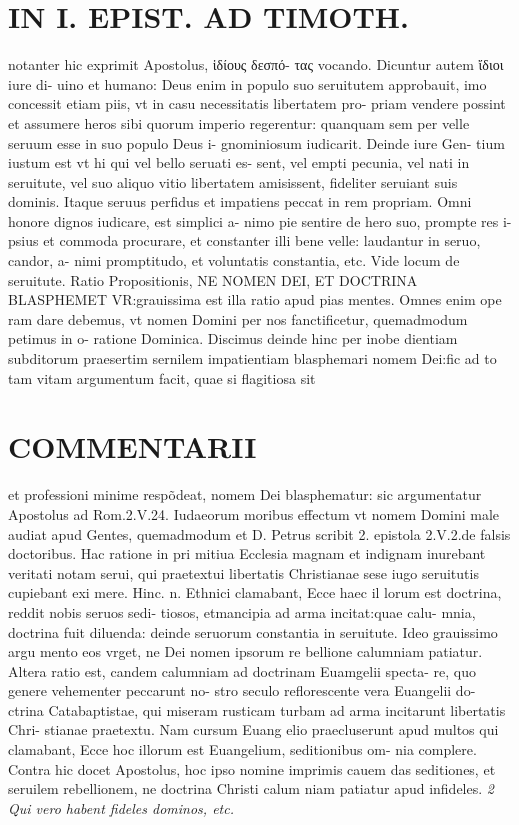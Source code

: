 \documentclass{article}
\begin{document}
\begin{pages}
\section*{IN I. EPIST. AD TIMOTH. }
\marginpar{[ p.145 ]}\pstart notanter hic exprimit Apostolus, ἱδίους δεσπό- τας vocando. Dicuntur autem ἴδιοι iure di- uino et humano: Deus enim in populo suo seruitutem approbauit, imo concessit etiam piis, vt in casu necessitatis libertatem pro- priam vendere possint et assumere heros sibi quorum imperio regerentur: quanquam sem per velle seruum esse in suo populo Deus i- gnominiosum iudicarit. Deinde iure Gen- tium iustum est vt hi qui vel bello seruati es- sent, vel empti pecunia, vel nati in seruitute, vel suo aliquo vitio libertatem amisissent, fideliter seruiant suis dominis. Itaque seruus perfidus et impatiens peccat in rem propriam. Omni honore dignos iudicare, est simplici a- nimo pie sentire de hero suo, prompte res i- psius et commoda procurare, et constanter illi bene velle: laudantur in seruo, candor, a- nimi promptitudo, et voluntatis constantia, etc. Vide locum de seruitute.  \pend\pstart Ratio Propositionis, NE NOMEN DEI, ET DOCTRINA BLASPHEMET VR:grauissima est illa ratio apud pias mentes. Omnes enim ope ram dare debemus, vt nomen Domini per nos fanctificetur, quemadmodum petimus in o- ratione Dominica. Discimus deinde hinc per inobe dientiam subditorum praesertim sernilem impatientiam blasphemari nomem Dei:fic ad to tam vitam argumentum facit, quae si flagitiosa sit  \pend
\marginpar{[ p.146 ]}
\section*{COMMENTARII }\pstart et professioni minime respõdeat, nomem Dei blasphematur: sic argumentatur Apostolus ad Rom.2.V.24. Iudaeorum moribus effectum vt nomem Domini male audiat apud Gentes, quemadmodum et D. Petrus scribit 2. epistola 2.V.2.de falsis doctoribus. Hac ratione in pri mitiua Ecclesia magnam et indignam inurebant veritati notam serui, qui praetextui libertatis Christianae sese iugo seruitutis cupiebant exi mere. Hinc. n. Ethnici clamabant, Ecce haec il lorum est doctrina, reddit nobis seruos sedi- tiosos, etmancipia ad arma incitat:quae calu- mnia, doctrina fuit diluenda: deinde seruorum constantia in seruitute. Ideo grauissimo argu mento eos vrget, ne Dei nomen ipsorum re bellione calumniam patiatur. Altera ratio est, candem calumniam ad doctrinam Euamgelii specta- re, quo genere vehementer peccarunt no- stro seculo reflorescente vera Euangelii do- ctrina Catabaptistae, qui miseram rusticam turbam ad arma incitarunt libertatis Chri- stianae praetextu. Nam cursum Euang elio praecluserunt apud multos qui clamabant, Ecce hoc illorum est Euangelium, seditionibus om- nia complere. Contra hic docet Apostolus, hoc ipso nomine imprimis cauem das seditiones, et seruilem rebellionem, ne doctrina Christi calum niam patiatur apud infideles.  \pend
\textit{2 Qui vero habent fideles dominos, etc. }

\end{pages}
\end{document}
